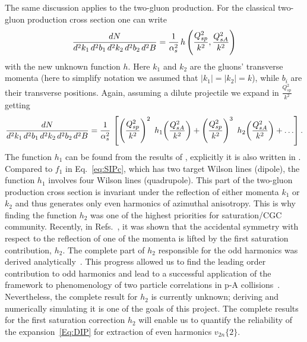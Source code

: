  
The same discussion  applies to the two-gluon production. For the
classical two-gluon production cross section one can write
\begin{align}
	\frac{dN}{d^2 k_1 \, d^2 b_1 \, d^2 k_2 \, d^2 b_2 \, d^2 B} 
  = \frac{1}{\alpha_s^2} \, h
  \left( 
  \frac{Q_{sp}^2}{k^2},  	 
   \frac{Q_{sA}^2}{k^2}  	 
  \right)
 \end{align}
 with the new unknown function $h$. Here $k_1$ and $k_2$ are the
 gluons' transverse momenta (here to simplify notation 
 we assumed that $|k_1|=|k_2|=k$), while $b_i$ are their
 transverse positions. Again, assuming a dilute projectile we expand
 in $\frac{Q_{sp}^2}{k^2}$ getting
\begin{align}
  \frac{dN}{d^2 k_1 \, d^2 b_1 \, d^2 k_2 \, d^2 b_2 \, d^2 B} =
  \frac{1}{\as^2} \, \left[ \left( \frac{Q_{sp}^2}{k^2}  \right)^2 \ 
	  h_1
    \!\left(  \frac{Q_{sA}^2}{k^2} \right) + \left( \frac{Q_{sp}^2}{k^2}  \right)^3 \ h_2 \! \left( \frac{Q_{sA}^2}{k^2}  \right) + \ldots
  \right] .
  \label{Eq:DIP}
\end{align}
The function $h_1$ can be found from the results of
\myrefs\cite{Kovner:2012jm,Kovchegov:2012nd,Altinoluk:2018ogz}, 
explicitly it is also written in \myrefs\cite{Kovner:2018fxj}. 
Compared to $f_1$ in Eq.~\eqref{eq:SIPc}, which has two target Wilson lines (dipole), 
the function $h_1$ involves four Wilson lines (quadrupole). 
This
part of the two-gluon production cross section is invariant  
under the reflection of either momenta $k_1$ or $k_2$ and thus 
generates  only even harmonics of azimuthal anisotropy. This is why finding the function $h_2$ 
was one of the highest priorities for saturation/CGC community. 
Recently, in Refs.~\cite{McLerran:2016snu,Kovchegov:2018jun},
it was shown that the accidental symmetry with respect to the 
reflection of one of the momenta is lifted by the 
first saturation contribution, $h_2$. 
The complete part of $h_2$ responsible for the
odd harmonics was derived analytically~\cite{McLerran:2016snu,Kovchegov:2018jun}. 
This progress allowed us to find the leading order contribution to odd harmonics and lead to 
a  
successful application of the framework to phenomenology of two particle correlations in p-A 
collisions~\cite{Mace:2018vwq,Mace:2018yvl}.
Nevertheless, the complete result for $h_2$ is currently unknown; 
deriving and numerically simulating it is one  of the goals of this project.
The complete results for the first saturation correction $h_2$
will enable us to quantify the reliability of the expansion~\eqref{Eq:DIP}
for extraction of even harmonics  $v_{2n}\{2\}$. 

